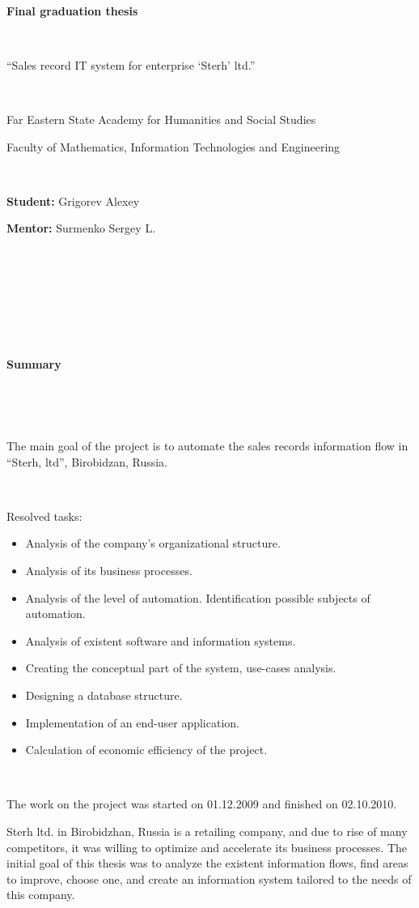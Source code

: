 \documentclass[a4paper, 12pt]{article}
\begin{document}
\begin{center}

\


{\large
\textbf{Final graduation thesis}

\

``Sales record IT system for enterprise `Sterh' ltd.''
}

\


Far Eastern State Academy for Humanities and Social Studies

Faculty of Mathematics, Information Technologies and Engineering

\

\textbf{Student:} Grigorev Alexey

\textbf{Mentor:} Surmenko Sergey L.

\

\

\

\

{\large\textbf{Summary}}

\end{center}

\

\

The main goal of the project is to automate the sales records information flow in ``Sterh, ltd'', Birobidzan, Russia.

\


Resolved tasks:
\begin{itemize}
\item Analysis of the company's organizational structure.
\item Analysis of its business processes.
\item Analysis of the level of automation. Identification possible subjects of automation.
\item Analysis of existent software and information systems.
\item Creating the conceptual part of the system, use-cases analysis.
\item Designing a database structure.
\item Implementation of an end-user application.
\item Calculation of economic efficiency of the project.
\end{itemize}

\

The work on the project was started on 01.12.2009 and finished on 02.10.2010.


\newpage

Sterh ltd. in Birobidzhan, Russia is a retailing company, and due to rise of many competitors, it was willing to optimize and accelerate its business processes. The initial goal of this thesis was to analyze the existent information flows, find areas to improve, choose one, and create an information system tailored to the needs of this company.
\end{document}
